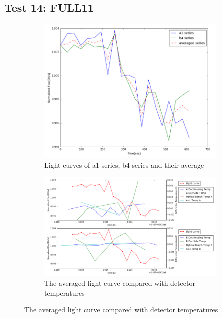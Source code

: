 \documentclass{aastex6}
\begin{document}
\subsection{Test 14: FULL11} 
\begin{figure}[H]
    \centering
    \begin{subfigure}{1}
        \includegraphics[scale=0.4]{ts_test14}
        \caption{Light curves of a1 series, b4 series and their average}
    \end{subfigure}

    \begin{subfigure}{2}
        \includegraphics[scale=0.4]{temp_test14}
        \caption{The averaged light curve compared with detector temperatures}
    \end{subfigure}
   

\end{figure}
\end{document}
